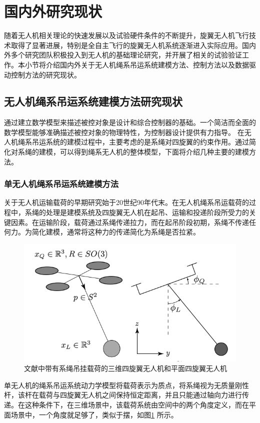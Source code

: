 \documentclass[lang=chs, degree=master, blindreview=false, winfonts=true]{yanputhesis}
\begin{document}



\section{国内外研究现状}
随着无人机相关理论的快速发展以及试验硬件条件的不断提升，旋翼无人机飞行技术取得了显著进展，特别是全自主飞行的旋翼无人机系统逐渐进入实际应用。国内外多个研究团队积极投入到无人机的基础理论研究，并开展了相关的试验验证工作。本小节将介绍国内外关于无人机绳系吊运系统建模方法、控制方法以及数据驱动控制方法的研究现状。
\subsection{无人机绳系吊运系统建模方法研究现状}
通过建立数学模型来描述被控对象是设计和综合控制器的基础。一个简洁而全面的数学模型能够准确描述被控对象的物理特性，为控制器设计提供有力指导。
在无人机绳系吊运系统的建模过程中，主要考虑的是系绳对四旋翼的约束作用。通过简化对系绳的建模，可以得到绳系无人机的整体模型，下面将介绍几种主要的建模方法。
\subsubsection{单无人机绳系吊运系统建模方法}
关于无人机运输载荷的早期研究始于20世纪90年代末\cite{oshman1999mini,borky1997payload}。在无人机绳系吊运载荷的过程中，系绳的处理是建模系统及四旋翼无人机在起吊、运输和投递阶段所受力的关键因素\cite{qian2020guidance}。在运输阶段，载荷通过系绳传递拉力，而在起吊阶段初期，系绳不传递任何力\cite{guo2020controlling}。为简化建模，通常将这种力的传递简化为系绳是否拉紧\cite{tang2018aggressive}。

\begin{figure}[hbt!]
	\centering
	\includegraphics[width=28pc]{picture/1_1.png} 
	\caption{文献中带有系绳吊挂载荷的三维四旋翼无人机和平面四旋翼无人机} \label{1_1}
\end{figure}
单无人机的绳系吊运系统动力学模型将载荷表示为质点，将系绳视为无质量刚性杆，该杆在载荷与四旋翼无人机之间保持恒定距离，并且只能通过轴向力进行传递。在这种条件下，在三维场景中，该载荷系统由空间中的两个角度定义，而在平面场景中，一个角度就足够了，类似于摆\cite{sun2021novel}，如图\ref{1_1} 所示。
\end{document}
